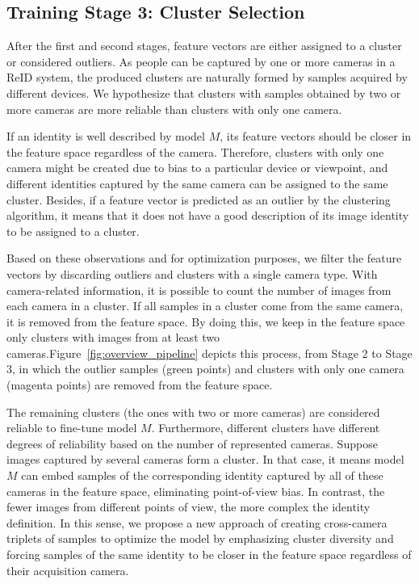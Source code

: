 \documentclass[journal]{IEEEtran}
\begin{document}
\subsection{Training Stage 3: Cluster Selection}
\label{subsec:cluster_selection}

After the first and second stages, feature vectors are either assigned to a cluster or considered outliers. As people can be captured by one or more cameras in a ReID system, the produced clusters are naturally formed by samples acquired by different devices. We hypothesize that clusters with samples obtained by two or more cameras are more reliable than clusters with only one camera. 

If an identity is well described by model $M$, its feature vectors should be closer in the feature space regardless of the camera. Therefore, clusters with only one camera might be created due to bias to a particular device or viewpoint, and different identities captured by the same camera can be assigned to the same cluster. Besides, if a feature vector is predicted as an outlier by the clustering algorithm, it means that it does not have a good description of its image identity to be assigned to a cluster.

Based on these observations and for optimization purposes, we filter the feature vectors by discarding outliers and clusters with a single camera type.
With camera-related information, it is possible to count the number of images from each camera in a cluster. If all samples in a cluster come from the same camera, it is removed from the feature space. By doing this, we keep in the feature space only clusters with images from at least two cameras.Figure~\ref{fig:overview_pipeline} depicts this process, from Stage 2 to Stage 3, in which the outlier samples (green points) and clusters with only one camera (magenta points) are removed from the feature space. 

The remaining clusters (the ones with two or more cameras) are considered reliable to fine-tune model $M$. Furthermore, different clusters have different degrees of reliability based on the number of represented cameras. 
Suppose images captured by several cameras form a cluster. In that case, it means model $M$ can embed samples of the corresponding identity captured by all of these cameras in the feature space, eliminating point-of-view bias. In contrast, the fewer images from different points of view, the more complex the identity definition.
In this sense, we propose a new approach of creating cross-camera triplets of samples to optimize the model by emphasizing cluster diversity and forcing samples of the same identity to be closer in the feature space regardless of their acquisition camera.
\end{document}
